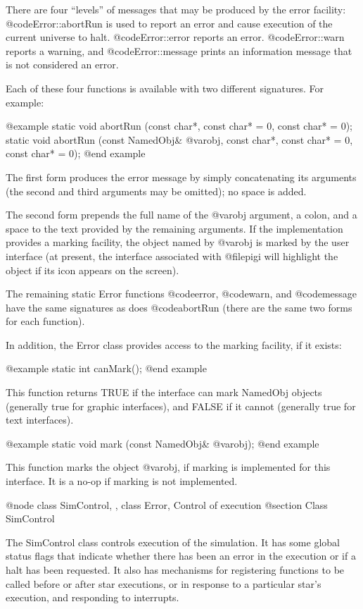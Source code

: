 There are four ``levels'' of messages that may be produced by the error
facility: @code{Error::abortRun} is used to report an error and cause execution
of the current universe to halt.
@code{Error::error} reports an error.
@code{Error::warn} reports a warning, and @code{Error::message} prints
an information message that is not considered an error.

Each of these four functions is available with two different signatures.
For example:

@example
static void abortRun (const char*, const char* = 0, const char* = 0);
static void abortRun (const NamedObj& @var{obj}, const char*, const char* = 0,
                      const char* = 0);
@end example

The first form produces the error message by simply concatenating its
arguments (the second and third arguments may be omitted); no space is
added.

The second form prepends the full name of the @var{obj} argument, a
colon, and a space to the text provided by the remaining arguments.
If the implementation provides a marking facility, the object named
by @var{obj} is marked by the user interface (at present, the interface
associated with @file{pigi} will highlight the object if its icon
appears on the screen).

The remaining static Error functions @code{error}, @code{warn}, and
@code{message} have the same signatures as does @code{abortRun} (there
are the same two forms for each function).

In addition, the Error class provides access to the marking facility,
if it exists:

@example
static int canMark();
@end example

This function returns TRUE if the interface can mark NamedObj objects
(generally true for graphic interfaces), and FALSE if it cannot
(generally true for text interfaces).

@example
static void mark (const NamedObj& @var{obj});
@end example

This function marks the object @var{obj}, if marking is implemented for
this interface.  It is a no-op if marking is not implemented.

@node class SimControl,  , class Error, Control of execution
@section Class SimControl

The SimControl class controls execution of the simulation.  It has
some global status flags that indicate whether there has been an
error in the execution or if a halt has been requested.  It also
has mechanisms for registering functions to be called before or
after star executions, or in response to a particular star's execution,
and responding to interrupts.

